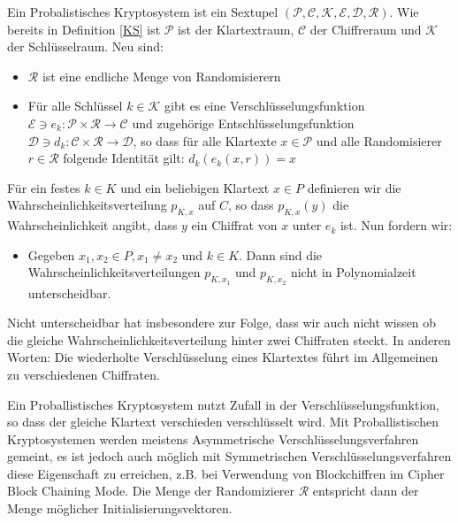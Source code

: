 \begin{theorem}
	\label{PKS}
	Ein Probalistisches Kryptosystem ist ein Sextupel $(\mathcal{P},\mathcal{C},\mathcal{K},\mathcal{E},\mathcal{D},\mathcal{R})$. Wie bereits in Definition \ref{KS} ist $\mathcal{P}$ ist der Klartextraum, $\mathcal{C}$ der Chiffreraum und $\mathcal{K}$ der Schlüsselraum. Neu sind:
	\begin{itemize}
		\item $\mathcal{R}$ ist eine endliche Menge von Randomisierern
		\item Für alle Schlüssel $k\in \mathcal{K}$ gibt es eine Verschlüsselungsfunktion $\mathcal{E}\ni e_k:\mathcal{P}\times\mathcal{R}\rightarrow\mathcal{C}$ und zugehörige Entschlüsselungsfunktion $\mathcal{D}\ni d_k:\mathcal{C}\times\mathcal{R}\rightarrow\mathcal{D}$, so dass für alle Klartexte $x\in\mathcal{P}$ und alle Randomisierer $r\in\mathcal{R}$ folgende Identität gilt: $d_k(e_k(x,r)) = x$ 
	\end{itemize}
	Für ein festes $k\in K$ und ein beliebigen Klartext $x\in P$ definieren wir die Wahrscheinlichkeitsverteilung $p_{K,x}$ auf $C$, so dass  $p_{K,x}(y)$ die Wahrscheinlichkeit angibt, dass $y$ ein Chiffrat von $x$ unter $e_k$ ist. Nun fordern wir:
	
	\begin{itemize}
		\item Gegeben $x_1,x_2\in P, x_1\neq x_2$ und $k\in K$. Dann sind die Wahrscheinlichkeitsverteilungen $p_{K,x_1}$ und  $p_{K,x_2}$ nicht in Polynomialzeit unterscheidbar.
	\end{itemize}
\end{theorem}

Nicht unterscheidbar hat insbesondere zur Folge, dass wir auch nicht wissen ob die gleiche Wahrscheinlichkeitsverteilung hinter zwei Chiffraten steckt. In anderen Worten: Die wiederholte Verschlüsselung eines Klartextes führt im Allgemeinen zu verschiedenen Chiffraten.

Ein Proballistisches Kryptosystem nutzt Zufall in der Verschlüsselungsfunktion, so dass der gleiche Klartext verschieden verschlüsselt wird. Mit Proballistischen Kryptosystemen werden meistens Asymmetrische Verschlüsselungsverfahren gemeint, es ist jedoch auch möglich mit Symmetrischen Verschlüsselungsverfahren diese Eigenschaft zu erreichen, z.B. bei Verwendung von Blockchiffren im Cipher Block Chaining Mode. Die Menge der Randomizierer $\mathcal{R}$ entspricht dann der Menge möglicher Initialisierungsvektoren. 

